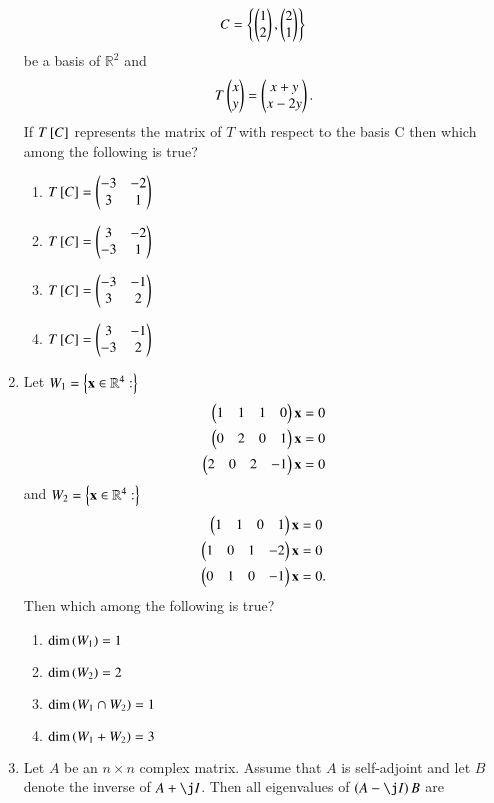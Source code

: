 \begin{enumerate}[label=\thesection.\arabic*.,ref=\thesection.\theenumi]
\begin{align}
C = \left\{\begin{pmatrix}1 \\ 2\end{pmatrix},\begin{pmatrix}2 \\ 1\end{pmatrix}\right\}
\end{align}
be a basis of $\mathbb{R}^2$ and 
\begin{align}
T\begin{pmatrix}x\\y\end{pmatrix} = \begin{pmatrix}x+y \\ x-2y\end{pmatrix}.
\end{align}
If $T{}\left[C\right]$ represents the matrix of $T$ with respect to the basis C then
which among the following is true?
\begin{enumerate}
\item $T{}\left[C\right] = \begin{pmatrix}-3 & -2\\3 & 1\end{pmatrix}$
\item $T{}\left[C\right] = \begin{pmatrix}3 & -2\\-3 & 1\end{pmatrix}$
\item $T{}\left[C\right] = \begin{pmatrix}-3 & -1\\3 & 2\end{pmatrix}$
\item $T{}\left[C\right] = \begin{pmatrix}3 & -1\\-3 & 2\end{pmatrix}$
\end{enumerate}
\solution

\item Let $W_1 = \left\{\mathbf{x} \in \mathbb{R}^4:\right\}$
\begin{align}
 \begin{pmatrix}1 & 1 & 1 & 0\end{pmatrix}\mathbf{x} = 0
\\
 \begin{pmatrix}0 & 2 & 0 & 1\end{pmatrix}\mathbf{x} = 0
\\
 \begin{pmatrix}2 & 0 & 2 & -1\end{pmatrix}\mathbf{x} = 0
\end{align}
and
$W_2 = \left\{\mathbf{x} \in \mathbb{R}^4:\right\}$
\begin{align}
 \begin{pmatrix}1 & 1 & 0 & 1\end{pmatrix}\mathbf{x} &= 0
\\
 \begin{pmatrix}1 & 0 & 1 & -2\end{pmatrix}\mathbf{x} &= 0
\\
 \begin{pmatrix}0 & 1 & 0 & -1\end{pmatrix}\mathbf{x} &= 0.
\end{align}
Then which among the following is true?
\begin{enumerate}
\item $\text{dim}\left(W_1\right) = 1$
\item $\text{dim}\left(W_2\right) = 2$
\item $\text{dim}\left(W_1 \cap W_2\right) = 1$
\item $\text{dim}\left(W_1+W_2\right) = 3$
\end{enumerate}
%
\item Let $A$ be an $n \times n$ complex matrix.  Assume that $A$ is self-adjoint and let $B$ denote the inverse of $A + \j I$. Then all eigenvalues of $\brak{A-\j I}B$ are 

\end{enumerate}
